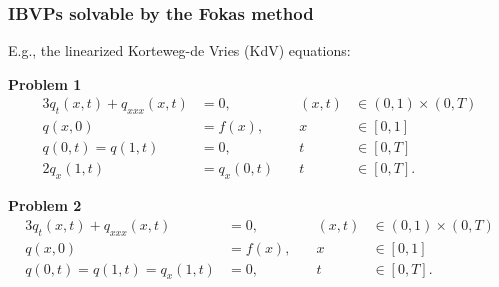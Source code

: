 \documentclass{beamer}
\begin{document}

\begin{frame}[t]
    \frametitle{IBVPs solvable by the Fokas method}
    E.g., the linearized Korteweg-de Vries (KdV) equations:
    \newline

    \textbf{Problem 1}
    \begin{alignat*}{3}
        q_t(x,t) + q_{xxx}(x,t) &= 0,\quad &(x,t)&\in (0,1)\times (0,T)\\
        q(x,0) &= f(x),\quad &x&\in [0,1]\\
        q(0,t) = q(1,t) &= 0, \quad &t&\in [0,T]\\
        2q_x(1,t) &= q_x(0,t)\quad &t&\in [0,T].
    \end{alignat*}

    \textbf{Problem 2}
    \begin{alignat*}{3}
        q_t(x,t) + q_{xxx}(x,t) &= 0,\quad &(x,t)&\in (0,1)\times (0,T)\\
        q(x,0) &= f(x),\quad &x&\in [0,1]\\
        q(0,t) = q(1,t) = q_x(1,t) &= 0, \quad &t&\in [0,T].
    \end{alignat*}
\end{frame}
\end{document}
